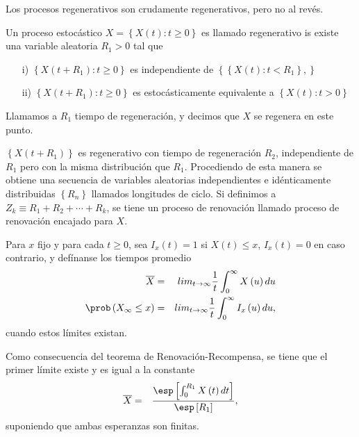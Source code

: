 \begin{Note}
Los procesos regenerativos son crudamente regenerativos, pero no al rev\'es.
\end{Note}
\begin{Def}
Un proceso estoc\'astico $X=\left\{X\left(t\right):t\geq0\right\}$ es llamado regenerativo is existe una variable aleatoria $R_{1}>0$ tal que
\begin{itemize}
\item[i)] $\left\{X\left(t+R_{1}\right):t\geq0\right\}$ es independiente de $\left\{\left\{X\left(t\right):t<R_{1}\right\},\right\}$
\item[ii)] $\left\{X\left(t+R_{1}\right):t\geq0\right\}$ es estoc\'asticamente equivalente a $\left\{X\left(t\right):t>0\right\}$
\end{itemize}

Llamamos a $R_{1}$ tiempo de regeneraci\'on, y decimos que $X$ se regenera en este punto.
\end{Def}

$\left\{X\left(t+R_{1}\right)\right\}$ es regenerativo con tiempo de regeneraci\'on $R_{2}$, independiente de $R_{1}$ pero con la misma distribuci\'on que $R_{1}$. Procediendo de esta manera se obtiene una secuencia de variables aleatorias independientes e id\'enticamente distribuidas $\left\{R_{n}\right\}$ llamados longitudes de ciclo. Si definimos a $Z_{k}\equiv R_{1}+R_{2}+\cdots+R_{k}$, se tiene un proceso de renovaci\'on llamado proceso de renovaci\'on encajado para $X$.




\begin{Def}
Para $x$ fijo y para cada $t\geq0$, sea $I_{x}\left(t\right)=1$ si $X\left(t\right)\leq x$,  $I_{x}\left(t\right)=0$ en caso contrario, y def\'inanse los tiempos promedio
\begin{eqnarray*}
\overline{X}&=&lim_{t\rightarrow\infty}\frac{1}{t}\int_{0}^{\infty}X\left(u\right)du\\
\prob\left(X_{\infty}\leq x\right)&=&lim_{t\rightarrow\infty}\frac{1}{t}\int_{0}^{\infty}I_{x}\left(u\right)du,
\end{eqnarray*}
cuando estos l\'imites existan.
\end{Def}

Como consecuencia del teorema de Renovaci\'on-Recompensa, se tiene que el primer l\'imite  existe y es igual a la constante
\begin{eqnarray*}
\overline{X}&=&\frac{\esp\left[\int_{0}^{R_{1}}X\left(t\right)dt\right]}{\esp\left[R_{1}\right]},
\end{eqnarray*}
suponiendo que ambas esperanzas son finitas.

